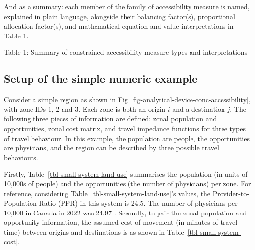 \documentclass[
  10pt,
  letterpaper,
]{article}
\newcommand{\blandscape}{\begin{landscape}}
\newcommand{\elandscape}{\end{landscape}}
\begin{document}
And as a summary: each member of the family of accessibility measure is
named, explained in plain language, alongside their balancing factor(s),
proportional allocation factor(s), and mathematical equation and value
interpretations in Table 1.

\blandscape



Table 1: Summary of constrained accessibility measure types and
interpretations

\elandscape

\subsection{Setup of the simple numeric
example}\label{setup-of-the-simple-numeric-example}

Consider a simple region as shown in
Fig~\ref{fig-analytical-device-conc-accessibility}, with zone IDs 1, 2
and 3. Each zone is both an origin \(i\) and a destination \(j\). The
following three pieces of information are defined: zonal population and
opportunities, zonal cost matrix, and travel impedance functions for
three types of travel behaviour. In this example, the population are
people, the opportunities are physicians, and the region can be
described by three possible travel behaviours.

Firstly, Table~\ref{tbl-small-system-land-use} summarises the population
(in units of 10,000s of people) and the opportunities (the number of
physicians) per zone. For reference, considering
Table~\ref{tbl-small-system-land-use}'s values, the
Provider-to-Population-Ratio (PPR) in this system is 24.5. The number of
physicians per 10,000 in Canada in 2022 was 24.97
\citep{whoMedicalDoctors102025}. Secondly, to pair the zonal population
and opportunity information, the assumed cost of movement (in minutes of
travel time) between origins and destinations is as shown in
Table~\ref{tbl-small-system-cost}.
\end{document}
